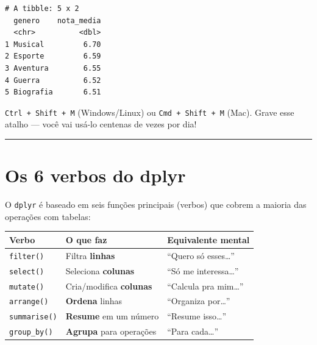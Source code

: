 \documentclass[
  letterpaper,
]{scrbook}
\newcounter{none} %
\begin{document}
\begin{verbatim}
# A tibble: 5 x 2
  genero    nota_media
  <chr>          <dbl>
1 Musical         6.70
2 Esporte         6.59
3 Aventura        6.55
4 Guerra          6.52
5 Biografia       6.51
\end{verbatim}

\begin{tcolorbox}[enhanced jigsaw, arc=.35mm, bottomrule=.15mm, bottomtitle=1mm, breakable, colback=white, colbacktitle=quarto-callout-tip-color!10!white, colframe=quarto-callout-tip-color-frame, coltitle=black, left=2mm, leftrule=.75mm, opacityback=0, opacitybacktitle=0.6, rightrule=.15mm, title=\textcolor{quarto-callout-tip-color}{\faLightbulb}\hspace{0.5em}{Atalho do pipe}, titlerule=0mm, toprule=.15mm, toptitle=1mm]

\texttt{Ctrl\ +\ Shift\ +\ M} (Windows/Linux) ou
\texttt{Cmd\ +\ Shift\ +\ M} (Mac). Grave esse atalho --- você vai
usá-lo centenas de vezes por dia!

\end{tcolorbox}

\begin{center}\rule{0.5\linewidth}{0.5pt}\end{center}

\section{Os 6 verbos do dplyr}\label{os-6-verbos-do-dplyr-1}

O \texttt{dplyr} é baseado em seis funções principais (verbos) que
cobrem a maioria das operações com tabelas:

{\def\LTcaptype{none} %
\begin{longtable}[]{@{}lll@{}}
\toprule\noalign{}
Verbo & O que faz & Equivalente mental \\
\midrule\noalign{}
\endhead
\bottomrule\noalign{}
\endlastfoot
\texttt{filter()} & Filtra \textbf{linhas} & ``Quero só
esses\ldots{}'' \\
\texttt{select()} & Seleciona \textbf{colunas} & ``Só me
interessa\ldots{}'' \\
\texttt{mutate()} & Cria/modifica \textbf{colunas} & ``Calcula pra
mim\ldots{}'' \\
\texttt{arrange()} & \textbf{Ordena} linhas & ``Organiza
por\ldots{}'' \\
\texttt{summarise()} & \textbf{Resume} em um número & ``Resume
isso\ldots{}'' \\
\texttt{group\_by()} & \textbf{Agrupa} para operações & ``Para
cada\ldots{}'' \\
\end{longtable}
}
\end{document}
